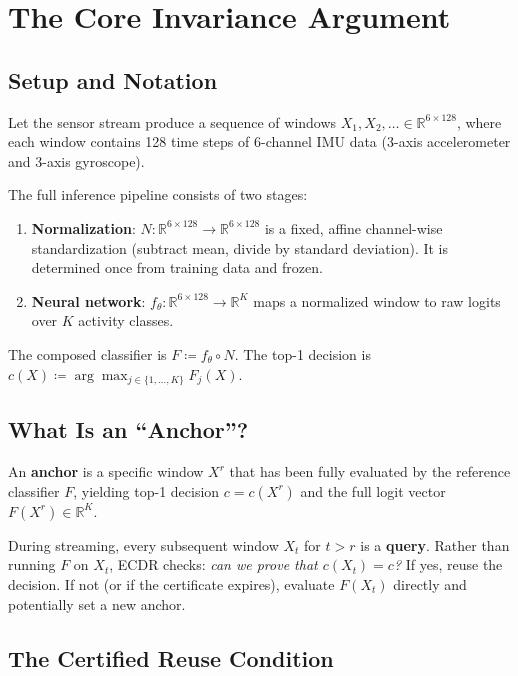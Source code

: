 \documentclass[11pt, a4paper]{article}
\theoremstyle{definition}
\theoremstyle{plain}
\newcommand{\R}{\mathbb{R}}
\begin{document}
\section{The Core Invariance Argument}

\subsection{Setup and Notation}

Let the sensor stream produce a sequence of windows
$X_1, X_2, \ldots \in \R^{6 \times 128}$, where each window contains 128 time
steps of 6-channel IMU data (3-axis accelerometer and 3-axis gyroscope).

The full inference pipeline consists of two stages:
\begin{enumerate}
  \item \textbf{Normalization}: $N: \R^{6\times128} \to \R^{6\times128}$ is a
        fixed, affine channel-wise standardization (subtract mean, divide by
        standard deviation). It is determined once from training data and frozen.
  \item \textbf{Neural network}: $f_\theta: \R^{6\times128} \to \R^K$ maps a
        normalized window to raw logits over $K$ activity classes.
\end{enumerate}

The composed classifier is $F \coloneqq f_\theta \circ N$. The top-1 decision is
$c(X) \coloneqq \arg\max_{j \in \{1,\ldots,K\}} F_j(X)$.

\subsection{What Is an ``Anchor''?}

An \textbf{anchor} is a specific window $X^r$ that has been fully evaluated by the
reference classifier $F$, yielding top-1 decision $c = c(X^r)$ and the full logit
vector $F(X^r) \in \R^K$.

During streaming, every subsequent window $X_t$ for $t > r$ is a \textbf{query}.
Rather than running $F$ on $X_t$, ECDR checks: \emph{can we prove that
$c(X_t) = c$?} If yes, reuse the decision. If not (or if the certificate expires),
evaluate $F(X_t)$ directly and potentially set a new anchor.

\subsection{The Certified Reuse Condition}
\end{document}
